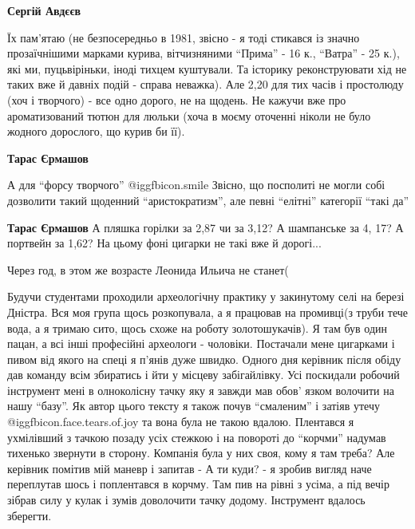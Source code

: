 \begin{itemize}
\begin{itemize}
\begin{itemize} %
\textbf{Сергій Авдєєв} 

Їх пам'ятаю (не безпосередньо в 1981, звісно - я тоді стикався із значно
прозаїчнішими марками курива, вітчизняними \enquote{Прима} - 16 к., \enquote{Ватра} - 25 к.),
які ми, пуцьвіріньки, іноді тихцем куштували. Та історику реконструювати хід не
таких вже й давніх подій - справа неважка). Але 2,20 для тих часів і простолюду
(хоч і творчого) - все одно дорого, не на щодень. Не кажучи вже про
ароматизований тютюн для люльки (хоча в моєму оточенні ніколи не було жодного
дорослого, що курив би її).

\textbf{Тарас Єрмашов} 

А для \enquote{форсу творчого}  @igg{fbicon.smile}  Звісно, що посполиті не могли собі дозволити такий
щоденний \enquote{аристократизм}, але певні \enquote{елітні} категорії \enquote{такі да}

\textbf{Тарас Єрмашов} А пляшка горілки за 2,87 чи за 3,12? А шампанське за 4, 17? А портвейн за 1,62? На цьому фоні цигарки не такі вже й дорогі...
\end{itemize} %

\end{itemize} %


Через год, в этом же возрасте Леонида Ильича не станет(


Будучи студентами проходили археологічну практику у закинутому селі на березі
Дністра. Вся моя група щось розкопувала, а я працював на промивці(з труби тече
вода, а я тримаю сито, щось схоже на роботу золотошукачів). Я там був один
пацан, а всі інші професійні археологи - чоловіки. Постачали мене цигарками і
пивом від якого на спеці я п'янів дуже швидко. Одного дня керівник після обіду
дав команду всім збиратись і йти у місцеву забігайлівку. Усі поскидали робочий
інструмент мені в олноколісну тачку яку я завжди мав обов' язком волочити на
нашу \enquote{базу}. Як автор цього тексту я також почув \enquote{смаленим} і
затіяв утечу @igg{fbicon.face.tears.of.joy}  та вона була не такою вдалою. Плентався я ухмілівший з тачкою
позаду усіх стежкою і на повороті до \enquote{корчми} надумав тихенько звернути
в сторону. Компанія була у них своя, кому я там треба? Але керівник помітив мій
маневр і запитав - А ти куди? - я зробив вигляд наче переплутав шось і
поплентався в корчму. Там пив на рівні з усіма, а під вечір зібрав силу у кулак
і зумів доволочити тачку додому.  Інструмент вдалось зберегти.


\end{itemize}
